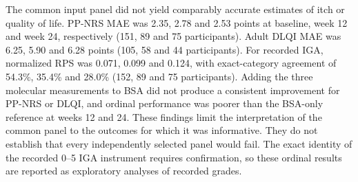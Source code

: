 \documentclass[10pt,a4paper]{article}
\begin{document}
The common input panel did not yield comparably accurate estimates of itch or quality of life. PP-NRS MAE was 2.35, 2.78 and 2.53 points at baseline, week 12 and week 24, respectively (151, 89 and 75 participants). Adult DLQI MAE was 6.25, 5.90 and 6.28 points (105, 58 and 44 participants). For recorded IGA, normalized RPS was 0.071, 0.099 and 0.124, with exact-category agreement of 54.3\%, 35.4\% and 28.0\% (152, 89 and 75 participants). Adding the three molecular measurements to BSA did not produce a consistent improvement for PP-NRS or DLQI, and ordinal performance was poorer than the BSA-only reference at weeks 12 and 24. These findings limit the interpretation of the common panel to the outcomes for which it was informative. They do not establish that every independently selected panel would fail. The exact identity of the recorded 0--5 IGA instrument requires confirmation, so these ordinal results are reported as exploratory analyses of recorded grades.
\end{document}
